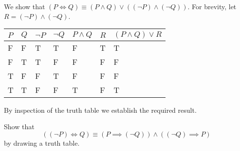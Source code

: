 \begin{example}
    We show that $(P \iff Q) \equiv (P \land Q) \lor ((\lnot P) \land (\lnot Q))$. For brevity, let $R = (\lnot P) \land (\lnot Q)$.
    \begin{table}[h]
        \centering
        \begin{tabular}{|l|l||l|l|l|l||l|}
            \hline
            $P$ & $Q$ & $\lnot P$ & $\lnot Q$ & $P \land Q$ & $R$ & $(P \land Q) \lor R$ \\ \hline
            F   & F   & T         & T         & F           & T   & T                    \\ \hline
            F   & T   & T         & F         & F           & F   & F                    \\ \hline
            T   & F   & F         & T         & F           & F   & F                    \\ \hline
            T   & T   & F         & F         & T           & F   & T                    \\ \hline
        \end{tabular}
    \end{table}

    By inspection of the truth table we establish the required result.
\end{example}

\begin{exercise}
    Show that
    \[
        ((\lnot P) \iff Q) \equiv (P \implies (\lnot Q)) \land ((\lnot Q) \implies P)
    \]
    by drawing a truth table.
\end{exercise}

